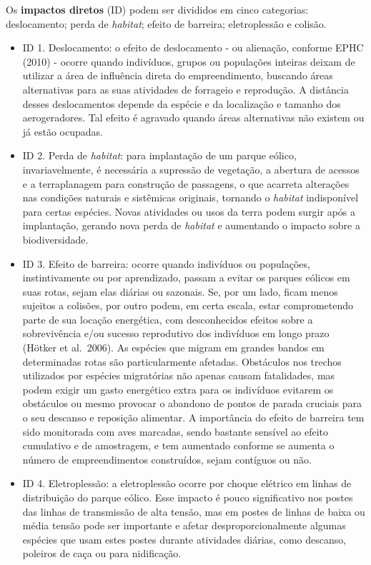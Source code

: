 \documentclass[
  oneside]{scrbook}
\providecommand{\tightlist}{%
  \setlength{\itemsep}{0pt}\setlength{\parskip}{0pt}}
\begin{document}
Os \textbf{impactos diretos} (ID) podem ser divididos em cinco categorias: deslocamento; perda de \emph{habitat}; efeito de barreira; eletroplessão e colisão.

\begin{itemize}
\tightlist
\item
  ID 1. Deslocamento: o efeito de deslocamento - ou alienação, conforme EPHC (2010) - ocorre quando indivíduos, grupos ou populações inteiras deixam de utilizar a área de influência direta do empreendimento, buscando áreas alternativas para as suas atividades de forrageio e reprodução. A distância desses deslocamentos depende da espécie e da localização e tamanho dos aerogeradores. Tal efeito é agravado quando áreas alternativas não existem ou já estão ocupadas.
\item
  ID 2. Perda de \emph{habitat}: para implantação de um parque eólico, invariavelmente, é necessária a supressão de vegetação, a abertura de acessos e a terraplanagem para construção de passagens, o que acarreta alterações nas condições naturais e sistêmicas originais, tornando o \emph{habitat} indisponível para certas espécies. Novas atividades ou usos da terra podem surgir após a implantação, gerando nova perda de \emph{habitat} e aumentando o impacto sobre a biodiversidade.
\item
  ID 3. Efeito de barreira: ocorre quando indivíduos ou populações, instintivamente ou por aprendizado, passam a evitar os parques eólicos em suas rotas, sejam elas diárias ou sazonais. Se, por um lado, ficam menos sujeitos a colisões, por outro podem, em certa escala, estar comprometendo parte de sua locação energética, com desconhecidos efeitos sobre a sobrevivência e/ou sucesso reprodutivo dos indivíduos em longo prazo (Hötker et al.~2006). As espécies que migram em grandes bandos em determinadas rotas são particularmente afetadas. Obstáculos nos trechos utilizados por espécies migratórias não apenas causam fatalidades, mas podem exigir um gasto energético extra para os indivíduos evitarem os obstáculos ou mesmo provocar o abandono de pontos de parada cruciais para o seu descanso e reposição alimentar. A importância do efeito de barreira tem sido monitorada com aves marcadas, sendo bastante sensível ao efeito cumulativo e de amostragem, e tem aumentado conforme se aumenta o número de empreendimentos construídos, sejam contíguos ou não.
\item
  ID 4. Eletroplessão: a eletroplessão ocorre por choque elétrico em linhas de distribuição do parque eólico. Esse impacto é pouco significativo nos postes das linhas de transmissão de alta tensão, mas em postes de linhas de baixa ou média tensão pode ser importante e afetar desproporcionalmente algumas espécies que usam estes postes durante atividades diárias, como descanso, poleiros de caça ou para nidificação.

\end{itemize}
\end{document}
